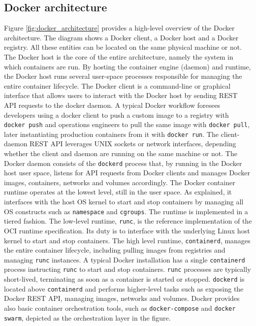 \subsection{Docker architecture}
Figure \ref{fig:docker_architecture} provides a high-level overview of the Docker architecture. The diagram shows a Docker client, a Docker host and a Docker registry. All these entities can be located on the same physical machine or not. 
The Docker host is the core of the entire architecture, namely the system in which containers are run. By hosting the container engine (daemon) and runtime, the Docker host runs several user-space processes responsible for managing the entire container lifecycle.
The Docker client is a command-line or graphical interface that allows users to interact with the Docker host by sending REST API requests to the docker daemon. A typical Docker workflow foresees developers using a docker client to push a custom image to a registry with \texttt{docker push} and operations engineers to pull the same image with \texttt{docker pull}, later instantiating production containers from it with \texttt{docker run}.
The client-daemon REST API leverages UNIX sockets or network interfaces, depending whether the client and daemon are running on the same machine or not.
The Docker daemon consists of the \texttt{dockerd} process that, by running in the Docker host user space, listens for API requests from Docker clients and manages Docker images, containers, networks and volumes accordingly. 
The Docker container runtime operates at the lowest level, still in the user space. As explained, it interfaces with the host OS kernel to start and stop containers by managing all OS constructs such as \texttt{namespace} and \texttt{cgroups}.
The runtime is implemented in a tiered fashion. The low-level runtime, \texttt{runc}, is the reference implementation of the OCI runtime specification. Its duty is to interface with the underlying Linux host kernel to start and stop containers. The high level runtime, \texttt{containerd}, manages the entire container lifecycle, including pulling images from registries and managing \texttt{runc} instances. \newline
A typical Docker installation has a single \texttt{containerd} process instructing \texttt{runc} to start and stop containers. \texttt{runc} processes are typically short-lived, terminating as soon as a container is started or stopped.
\texttt{dockerd} is located above \texttt{containerd} and performs higher-level tasks such as exposing the Docker REST API, managing images, networks and volumes. 
Docker provides also basic container orchestration tools, such as \texttt{docker-compose} and \texttt{docker swarm}, depicted as the orchestration layer in the figure.

